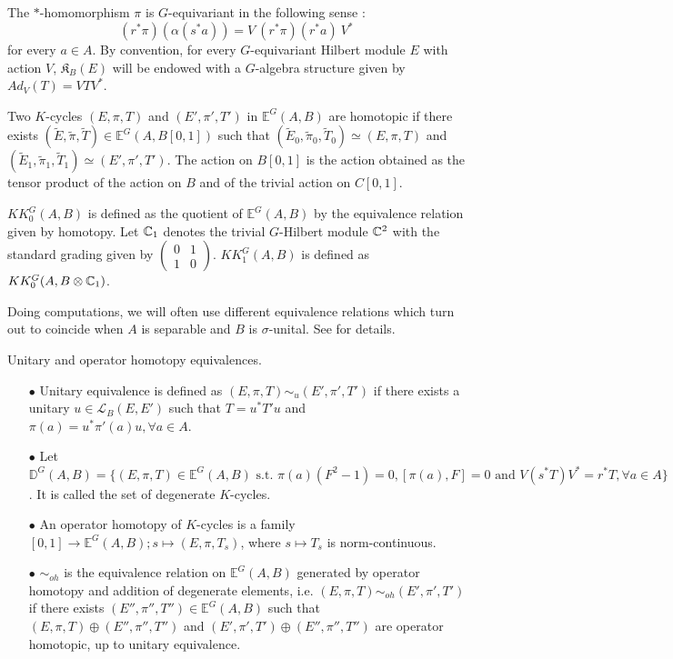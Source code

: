 \begin{rk} The $*$-homomorphism $\pi$ is $G$-equivariant in the following sense : \[(r^*\pi)(\alpha(s^*a)) = V \ (r^*\pi)(r^*a) \ V^*\] 
for every $a\in A$. By convention, for every $G$-equivariant Hilbert module $E$ with action $V$, $\mathfrak K_B(E)$ will be endowed with a $G$-algebra structure given by $Ad_V(T) = VTV^*$.  
\end{rk}

\begin{definition}
Two $K$-cycles $(E,\pi,T)$ and $ (E',\pi',T')$ in $\mathbb E^G(A,B)$ are homotopic if there exists $ (\tilde E,\tilde \pi,\tilde T) \in\mathbb E^G(A,B[0,1])$ such that $(\tilde E_0,\tilde \pi_0,\tilde T_0)\simeq (E,\pi,T)$ and $(\tilde E_1,\tilde \pi_1,\tilde T_1)\simeq (E',\pi',T')$. The action on $B[0,1]$ is the action obtained as the tensor product of the action on $B$ and of the trivial action on $C[0,1]$.
\end{definition}

\begin{definition} $KK_0^G(A,B)$ is defined as the quotient of $\mathbb E^G(A,B)$ by the equivalence relation given by homotopy. Let $\mathbb C_1$ denotes the trivial $G$-Hilbert module $\mathbb C^2$ with the standard grading given by $\begin{pmatrix}0 & 1 \\ 1 & 0 \end{pmatrix}$. $KK_1^G(A,B)$ is defined as $KK_0^G(A,B \otimes \mathbb C_1)$. 
\end{definition}

Doing computations, we will often use different equivalence relations which turn out to coincide when $A$ is separable and $B$ is $\sigma$-unital. See \cite{blackadar} for details.

\begin{definition} Unitary and operator homotopy equivalences.
\begin{itemize}
\item[$\bullet$]  Unitary equivalence is defined as $(E,\pi,T)\sim_{u} (E',\pi',T')$ if there exists a unitary $u\in\mathcal L_B(E,E')$ such that $T = u^* T' u$ and $\pi(a) = u^* \pi'(a) u , \forall a\in A$.
\item[$\bullet$] Let $\mathbb D^G(A,B) = \{(E,\pi,T) \in\mathbb E^G(A,B) \text{ s.t. } \pi(a)(F^2-1) = 0, [\pi(a),F]=0 \text{ and }V(s^*T)V^* = r^*T,\forall a\in A \}$. It is called the set of degenerate $K$-cycles.   
\item[$\bullet$] An operator homotopy of $K$-cycles is a family $[0,1]\rightarrow \mathbb E^G(A,B) ; s\mapsto (E,\pi,T_s)$, where $s\mapsto T_s$ is norm-continuous. 
\item[$\bullet$] $\sim_{oh}$ is the equivalence relation on $\mathbb E^G(A,B)$ generated by operator homotopy and addition of degenerate elements, i.e. $(E,\pi,T)\sim_{oh} (E',\pi',T')$ if there exists $(E'',\pi'',T'')\in\mathbb E^{G}(A,B)$ such that $(E,\pi,T)\oplus (E'',\pi'',T'')$ and $(E',\pi',T')\oplus (E'',\pi'',T'')$ are operator homotopic, up to unitary equivalence.
\end{itemize}
\end{definition}

